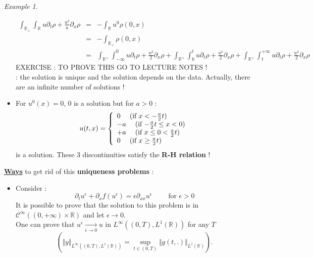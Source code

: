 \documentclass{report}
\newcommand{\R}{\ensuremath{\mathbb{R}}} %
\newcommand*{\definition}[1]{\noindent\textbf{\color{cadmiumgreen}{#1}}}
\theoremstyle{plain}
\theoremstyle{definition}
\theoremstyle{remark}
\newtheorem*{ex}{Example}
\begin{document}
\begin{ex}
\begin{itemize}
        \begin{eqnarray*}
        \int_{\R_+}\int_\R u \partial_t \rho + \frac{u^2}{u}\partial_x \rho &=& - \int_\R u^0 \rho(0,x)\\
        &=& - \int_{\R_+} \rho(0,x)\\
        &=&  \int_{\R^+}\int_{-\infty}^0 u \partial_t \rho + \frac{u^2}{2}\partial_x \rho + \int_{\R^+}\int_0^t u \partial_t \rho + \frac{u^2}{2}\partial_x \rho + \int_{\R^+}\int_t^{+\infty} u \partial_t \rho + \frac{u^2}{2}\partial_x \rho
        \end{eqnarray*}
        EXERCISE : TO PROVE THIS GO TO LECTURE NOTES !\\
        \definition{Well posed problem} : the solution is unique and the solution depends on the data.
        Actually, there are an infinite number of solutions ! 
        \item For $u^0(x)=0$, $0$ is a solution but for $a>0$ :
        \begin{equation*}
    	u(t,x) = \left\lbrace
    	\begin{array}[]{l}
    		 0 \quad \text{ (if $x<-\frac{a}{2}t$)}\\
    		 -a \quad  \text{ (if $-\frac{a}{2}t\le x < 0$)}\\
    		 +a \quad \text{ (if $ x \le 0 < \frac{a}{2}t$)}\\
    		 0 \quad \text{ (if $x \ge \frac{a}{2}t$)}\\
    	\end{array}\right.
        \end{equation*}
        is a solution. These 3 discontinuities satisfy the \textbf{R-H relation} !
    \end{itemize}
    \underline{\textbf{Ways}} to get rid of this \textbf{uniqueness problems} : 
    \begin{itemize}
        \item Consider :
        \begin{equation*}
            \partial_t u^\epsilon + \partial_x f(u^\epsilon) = \epsilon \partial_{xx}u^\epsilon \qquad \text{ for } \epsilon>0
        \end{equation*}
        It is possible to prove that the solution to this problem is in $\mathcal{C}^\infty\left((0,+\infty)\times \R \right)$ and let $\epsilon \rightarrow 0$. \\
        One can prove that $u^\epsilon \xrightarrow[\epsilon\rightarrow 0]{}u$ in $L^\infty\left((0,T),L^1(\R) \right)$ for any $T$ $$\left( \Vert y\Vert_{L^\infty\left((0,T),L^1(\R) \right)} = \sup\limits_{t\in(0,T)}\Vert g(t,.)\Vert_{L^1(\R)}\right). $$

\end{itemize}
\end{ex}
\end{document}
